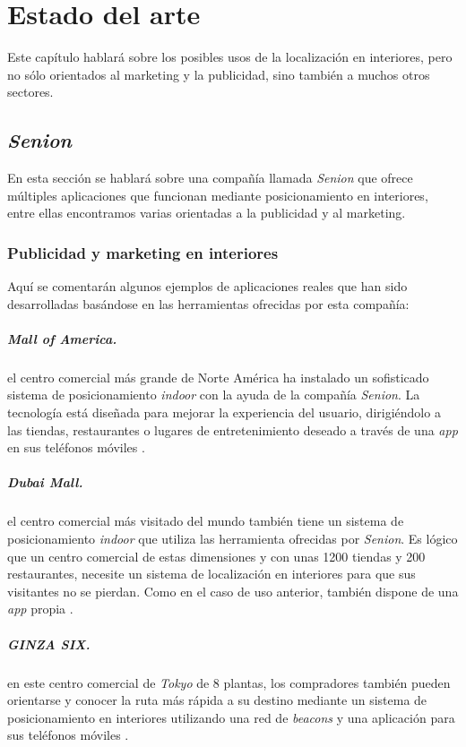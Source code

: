 \chapter{Estado del arte}
Este capítulo hablará sobre los posibles usos de la localización en interiores, pero no sólo orientados al marketing y la publicidad, sino también a muchos otros sectores.

\section{\textit{Senion}}
En esta sección se hablará sobre una compañía llamada \textit{Senion} que ofrece múltiples aplicaciones que funcionan mediante posicionamiento en interiores, entre ellas encontramos varias orientadas a la publicidad y al marketing.

\subsection{Publicidad y marketing en interiores}
Aquí se comentarán algunos ejemplos de aplicaciones reales que han sido desarrolladas basándose en las herramientas ofrecidas por esta compañía:

\paragraph{\textit{Mall of America}.} el centro comercial más grande de Norte América ha instalado un sofisticado sistema de posicionamiento \textit{indoor} con la ayuda de la compañía \textit{Senion}. La tecnología está diseñada para mejorar la experiencia del usuario, dirigiéndolo a las tiendas, restaurantes o lugares de entretenimiento deseado a través de una \textit{app} en sus teléfonos móviles \cite{noauthor_mall_nodate}.
\paragraph{\textit{Dubai Mall}.} el centro comercial más visitado del mundo también tiene un sistema de posicionamiento \textit{indoor} que utiliza las herramienta ofrecidas por \textit{Senion}. Es lógico que un centro comercial de estas dimensiones y con unas 1200 tiendas y 200 restaurantes, necesite un sistema de localización en interiores para que sus visitantes no se pierdan. Como en el caso de uso anterior, también dispone de una \textit{app} propia \cite{noauthor_dubai_nodate}.
\paragraph{\textit{GINZA SIX}.} en este centro comercial de \textit{Tokyo} de 8 plantas, los compradores también pueden orientarse y conocer la ruta más rápida a su destino mediante un sistema de posicionamiento en interiores utilizando una red de \textit{beacons} y una aplicación para sus teléfonos móviles \cite{noauthor_ginza_nodate}.
